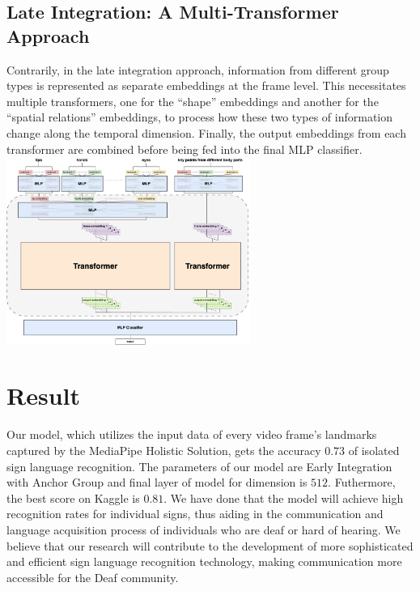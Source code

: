 \documentclass[10pt,twocolumn,letterpaper]{article}
\begin{document}
\begin{CJK*}{UTF8}{bsmi}
\subsection{Late Integration: A Multi-Transformer Approach}
Contrarily, in the late integration approach, information from different group types is represented as separate embeddings at the frame level. This necessitates multiple transformers, one for the “shape” embeddings and another for the “spatial relations” embeddings, to process how these two types of information change along the temporal dimension. Finally, the output embeddings from each transformer are combined before being fed into the final MLP classifier.
\includegraphics[width=80mm]{late_integration.drawio}
\section{Result}
Our model, which utilizes the input data of every video frame's landmarks captured by the MediaPipe Holistic Solution, 
gets the accuracy $0.73$ of isolated sign language recognition.
The parameters of our model are Early Integration with Anchor Group and final layer of model for dimension is $512$. Futhermore, the best score on Kaggle is $0.81$.
We have done that the model will achieve high recognition rates for individual signs, 
thus aiding in the communication and language acquisition process of individuals who are deaf or hard of hearing. 
We believe that our research will contribute to the development of more sophisticated and efficient sign language recognition technology, 
making communication more accessible for the Deaf community.

{\small


}

\end{CJK*}
\end{document}
